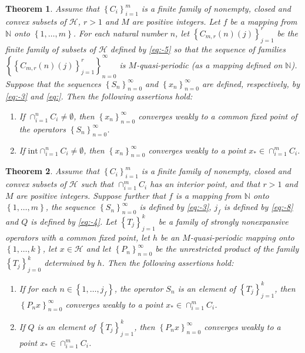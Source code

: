 \documentclass[]{interact}
\theoremstyle{plain}%
\newtheorem{theorem}{Theorem}[section]
\theoremstyle{definition}
\theoremstyle{remark}
\begin{document}
\begin{theorem}
\label{thm2}Assume that $\left\{ C_{i}\right\} _{i=1}^{m}$ is a
finite family of nonempty, closed and convex subsets of $\mathcal{H}$,
$r>1$ and $M$ are positive integers. Let $f$\textup{ }be a mapping
from $\mathbb{N}$ onto $\left\{ 1,\dots,m\right\} $. For each natural
number $n$, let $\left\{ C_{m,r}\left(n\right)\left(j\right)\right\} _{j=1}^{r}$
be the finite family of subsets of $\mathcal{H}$ defined by \eqref{eq:-5}
so that the sequence of families $\left\{ \left\{ C_{m,r}\left(n\right)\left(j\right)\right\} _{j=1}^{r}\right\} _{n=0}^{\infty}$
is $M$-quasi-periodic (as a mapping defined on $\mathbb{N}$). Suppose
that the sequences $\left\{ S_{n}\right\} _{n=0}^{\infty}$ and $\left\{ x_{n}\right\} _{n=0}^{\infty}$
are defined, respectively, by \eqref{eq:-3} and \eqref{eq:}.
Then the following assertions hold:
\begin{enumerate}
\item If $\cap_{i=1}^{n}C_{i}\not=\emptyset$, then $\left\{ x_{n}\right\} _{n=0}^{\infty}$
converges weakly to a common fixed point of the operators $\left\{ S_{n}\right\} _{n=0}^{\infty}$.
\item If $\mathrm{int}\cap_{i=1}^{n}C_{i}\not=\emptyset$, then $\left\{ x_{n}\right\} _{n=0}^{\infty}$
converges weakly to a point $x_{*}\in\cap_{i=1}^{m}C_{i}$.
\end{enumerate}
\end{theorem}
%
\begin{theorem}
\label{thm3}Assume that $\left\{ C_{i}\right\} _{i=1}^{m}$ is a
finite family of nonempty, closed and convex subsets of $\mathcal{H}$
such that $\cap_{i=1}^{m}C_{i}$ has an interior point,
and that $r>1$ and $M$ are positive integers.
Suppose further that $f$\textup{ }is a mapping
from $\mathbb{N}$ onto $\left\{ 1,\dots,m\right\}$, the sequence
$\left\{ S_{n}\right\} _{n=0}^{\infty}$ is defined
 by \eqref{eq:-3}, $j_{f}$
is defined by \eqref{eq:-8} and $Q$ is defined by \eqref{eq:-4}.
Let $\left\{ T_{j}\right\} _{j=1}^{k}$ be a family of strongly nonexpansive
operators \color{black}with a common fixed point, \color{black}let $h$ be an $M$-quasi-periodic mapping onto $\left\{ 1,\dots,k\right\} $,
let $x\in\mathcal{H}$ and let $\left\{ P_{n}\right\} _{n=0}^{\infty}$
be the \color{black}unrestricted \color{black} product of the family $\left\{ T_{j}\right\} _{j=0}^{k}$
determined by $h$. Then the following assertions hold:
\begin{enumerate}
\item If for each $n\in\left\{ 1,\dots,j_{f}\right\} $, the operator $S_{n}$
is an element of $\left\{ T_{j}\right\} _{j=1}^{k}$, then $\left\{ P_{n}x\right\} _{n=0}^{\infty}$
converges weakly to a point $x_{*}\in\cap_{i=1}^{m}C_{i}$.
\item If $Q$ is an element of $\left\{ T_{j}\right\} _{j=1}^{k}$, then
$\left\{ P_{n}x\right\} _{n=0}^{\infty}$ converges weakly to a point
$x_{*}\in\cap_{i=1}^{m}C_{i}$.
\end{enumerate}
\end{theorem}
\end{document}
